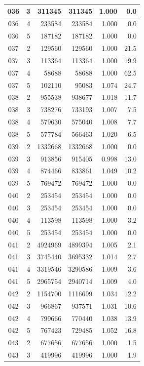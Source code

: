 \begin{longtable}{|c|r|r|r|r|r|}
\hline
036 & 3 & 311345 & 311345 & 1.000 & 0.0 \\
\hline
036 & 4 & 233584 & 233584 & 1.000 & 0.0 \\
\hline
036 & 5 & 187182 & 187182 & 1.000 & 0.0 \\
\hline
037 & 2 & 129560 & 129560 & 1.000 & 21.5 \\
\hline
037 & 3 & 113364 & 113364 & 1.000 & 19.9 \\
\hline
037 & 4 & 58688 & 58688 & 1.000 & 62.5 \\
\hline
037 & 5 & 102110 & 95083 & 1.074 & 24.7 \\
\hline
038 & 2 & 955538 & 938677 & 1.018 & 11.7 \\
\hline
038 & 3 & 738276 & 733193 & 1.007 & 7.5 \\
\hline
038 & 4 & 579630 & 575040 & 1.008 & 7.7 \\
\hline
038 & 5 & 577784 & 566463 & 1.020 & 6.5 \\
\hline
039 & 2 & 1332668 & 1332668 & 1.000 & 0.0 \\
\hline
039 & 3 & 913856 & 915405 & 0.998 & 13.0 \\
\hline
039 & 4 & 874466 & 833861 & 1.049 & 10.2 \\
\hline
039 & 5 & 769472 & 769472 & 1.000 & 0.0 \\
\hline
040 & 2 & 253454 & 253454 & 1.000 & 0.0 \\
\hline
040 & 3 & 253454 & 253454 & 1.000 & 0.0 \\
\hline
040 & 4 & 113598 & 113598 & 1.000 & 3.2 \\
\hline
040 & 5 & 253454 & 253454 & 1.000 & 0.0 \\
\hline
041 & 2 & 4924969 & 4899394 & 1.005 & 2.1 \\
\hline
041 & 3 & 3745440 & 3695332 & 1.014 & 2.7 \\
\hline
041 & 4 & 3319546 & 3290586 & 1.009 & 3.6 \\
\hline
041 & 5 & 2965754 & 2940714 & 1.009 & 4.0 \\
\hline
042 & 2 & 1154700 & 1116699 & 1.034 & 12.2 \\
\hline
042 & 3 & 966867 & 937571 & 1.031 & 10.6 \\
\hline
042 & 4 & 799666 & 770440 & 1.038 & 13.9 \\
\hline
042 & 5 & 767423 & 729485 & 1.052 & 16.8 \\
\hline
043 & 2 & 677656 & 677656 & 1.000 & 1.5 \\
\hline
043 & 3 & 419996 & 419996 & 1.000 & 1.9 \\

\end{longtable}
